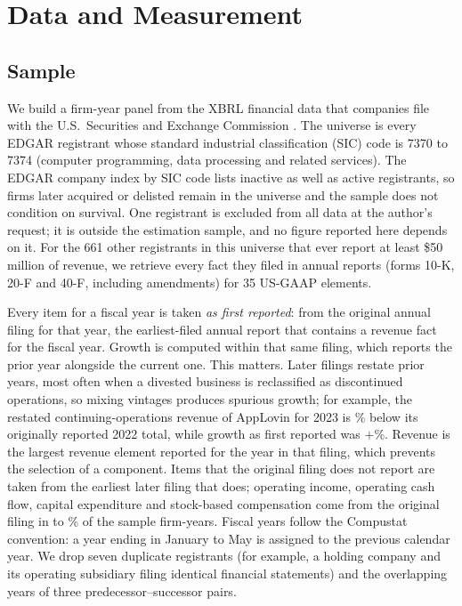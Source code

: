 \section{Data and Measurement}\label{sec:data}

\subsection{Sample}
We build a firm-year panel from the XBRL financial data that companies file with the U.S.\ Securities and Exchange Commission \citep{sec2026xbrlapi}. The universe is every EDGAR registrant whose standard industrial classification (SIC) code is 7370 to 7374 (computer programming, data processing and related services). The EDGAR company index by SIC code lists inactive as well as active registrants, so firms later acquired or delisted remain in the universe and the sample does not condition on survival. One registrant is excluded from all data at the author's request; it is outside the estimation sample, and no figure reported here depends on it. For the 661 other registrants in this universe that ever report at least \$50 million of revenue, we retrieve every fact they filed in annual reports (forms 10-K, 20-F and 40-F, including amendments) for 35 US-GAAP elements.

Every item for a fiscal year is taken \emph{as first reported}: from the original annual filing for that year, the earliest-filed annual report that contains a revenue fact for the fiscal year. Growth is computed within that same filing, which reports the prior year alongside the current one. This matters. Later filings restate prior years, most often when a divested business is reclassified as discontinued operations, so mixing vintages produces spurious growth; for example, the restated continuing-operations revenue of AppLovin for 2023 is \AppRestated\% below its originally reported 2022 total, while growth as first reported was $+$\AppGrowth\%. Revenue is the largest revenue element reported for the year in that filing, which prevents the selection of a component. Items that the original filing does not report are taken from the earliest later filing that does; operating income, operating cash flow, capital expenditure and stock-based compensation come from the original filing in \VOrigLo{} to \VOrigHi\% of the sample firm-years. Fiscal years follow the Compustat convention: a year ending in January to May is assigned to the previous calendar year. We drop seven duplicate registrants (for example, a holding company and its operating subsidiary filing identical financial statements) and the overlapping years of three predecessor--successor pairs.

